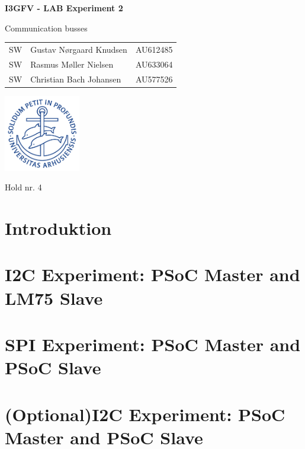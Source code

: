 \documentclass{article}
\begin{document}

\begin{titlepage}
    
  \begin{center}
    \vspace*{1cm}

    \Huge
    \textbf{I3GFV - LAB Experiment 2}

    \vspace{0.5cm}
    \huge
    Communication busses \\
    \date\today

    \vspace{3cm}

    \Large
    \begin{tabular}{l|l|r}
      SW & Gustav Nørgaard Knudsen & AU612485 \\
      SW & Rasmus Møller Nielsen & AU633064\\
      SW & Christian Bach Johansen & AU577526 \\
    \end{tabular}
    \vfill
    \includegraphics[width=0.25\textwidth]{au2}
    \vspace{2cm}

      Hold nr. 4

  \end{center}
\end{titlepage}

\newpage

\tableofcontents

\newpage

\setcounter{page}{1}


\section{Introduktion}

\section{I2C Experiment: PSoC Master and LM75 Slave}



\section{SPI Experiment: PSoC Master and PSoC Slave}



\section{(Optional)I2C Experiment: PSoC Master and PSoC Slave }
\end{document}
